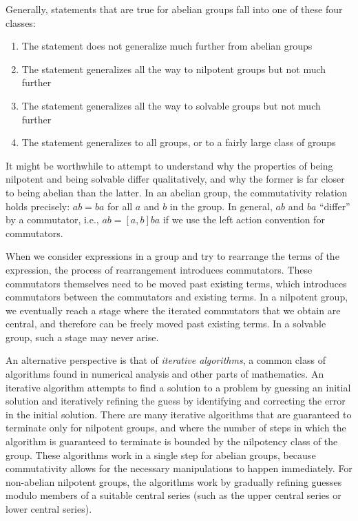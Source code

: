 Generally, statements that are true for abelian groups fall into one
of these four classes:

\begin{enumerate}
\item The statement does not generalize much further from abelian
  groups
\item The statement generalizes all the way to nilpotent groups but
  not much further
\item The statement generalizes all the way to solvable groups but not
  much further
\item The statement generalizes to all groups, or to a fairly large
  class of groups
\end{enumerate}

It might be worthwhile to attempt to understand why the properties of
being nilpotent and being solvable differ qualitatively, and why the
former is far closer to being abelian than the latter. In an abelian
group, the commutativity relation holds precisely: $ab = ba$ for all
$a$ and $b$ in the group. In general, $ab$ and $ba$ ``differ'' by a
commutator, i.e., $ab = [a,b]ba$ if we use the left action convention
for commutators.

When we consider expressions in a group and try to rearrange the terms
of the expression, the process of rearrangement introduces
commutators. These commutators themselves need to be moved past
existing terms, which introduces commutators between the commutators
and existing terms. In a nilpotent group, we eventually reach a stage
where the iterated commutators that we obtain are central, and
therefore can be freely moved past existing terms. In a solvable
group, such a stage may never arise.

An alternative perspective is that of {\em iterative algorithms}, a
common class of algorithms found in numerical analysis and other parts
of mathematics. An iterative algorithm attempts to find a solution to
a problem by guessing an initial solution and iteratively refining
the guess by identifying and correcting the error in the initial
solution. There are many iterative algorithms that are guaranteed to
terminate only for nilpotent groups, and where the number of steps in
which the algorithm is guaranteed to terminate is bounded by the
nilpotency class of the group. These algorithms work in a single step
for abelian groups, because commutativity allows for the necessary
manipulations to happen immediately. For non-abelian nilpotent groups,
the algorithms work by gradually refining guesses modulo members of a
suitable central series (such as the upper central series or lower
central series).

